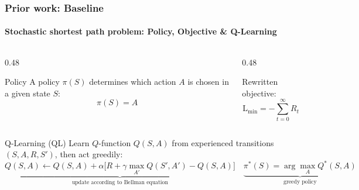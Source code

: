 \documentclass[11pt,aspectratio=1610]{beamer}
\begin{document}
    \begin{frame}
        \frametitle{Prior work: Baseline}
        \framesubtitle{Stochastic shortest path problem: Policy, Objective \& Q-Learning}
        \begin{columns}[t]
            \begin{column}{0.48\textwidth}
                \begin{block}{Policy}
                    \footnotesize
                    A policy $\pi(S)$ determines which action $A$ is chosen in a given state $S$:
                    \begin{equation*}
                        \pi(S) = A
                    \end{equation*}
                \end{block}
            \end{column}
            \begin{column}{0.48\textwidth}
                \begin{block}{Rewritten objective:}
                    \footnotesize
                    \begin{equation*}
                        \mathrm L_{\text{min}} = -\sum_{t=0}^{\infty} R_t
                    \end{equation*}
                \end{block}
            \end{column}
        \end{columns}
        \begin{alertblock}{Q-Learning (QL)}
            \footnotesize
            Learn $Q$-function $Q(S,A)$ from experienced transitions $(S,A,R,S')$, then act greedily:
            \begin{equation*}
                \underbrace{Q(S,A) \leftarrow Q(S,A) + \alpha\big[R + \gamma \max_{A'} Q(S',A') - Q(S,A)\big]}_{\text{update according to Bellman equation}}
                \quad
                \underbrace{\pi^*(S) = \arg\max_{A} Q^*(S,A)}_{\text{greedy policy}}
            \end{equation*}
        \end{alertblock}
        \vspace{-0.1cm}
        {\fontsize{5.5}{6.5}}
    \end{frame}

    
\end{document}
